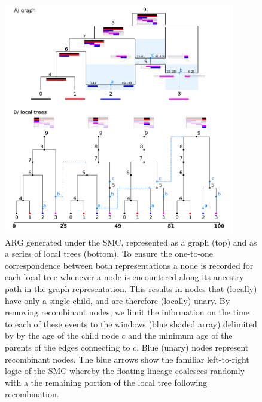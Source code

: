 \documentclass{article}
\begin{document}
\begin{figure}[!ht]
\centering
\includegraphics[width=0.9\textwidth]{figures/smc_custom_2rows_area_full_hap.png}
\caption{ARG generated under the SMC, represented as a graph (top) and as a
series of local trees (bottom). To ensure the one-to-one correspondence
between both representations a node is recorded for each local tree whenever
a node is encountered along its ancestry path in the graph representation.
This results in nodes that (locally) have only a single child, and are therefore
(locally) unary. By removing recombinant nodes, we limit the information on the time to each
of these events to the windows (blue shaded array) delimited by by the age of
the child node $c$ and the minimum age of the parents of the edges connecting to $c$.
Blue (unary) nodes represent recombinant nodes. The blue arrows show the
familiar left-to-right logic of the SMC whereby
the floating lineage coalesces randomly
with a the remaining portion of the local tree following recombination.
}
\label{fig:smc-unary}
\end{figure}
\end{document}

